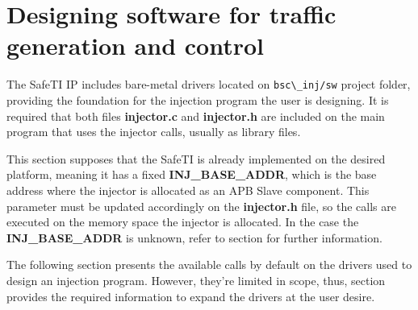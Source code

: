 \newpage
\section{Designing software for traffic generation and control}
\label{software}

The SafeTI IP includes bare-metal drivers located on \verb|bsc\_inj/sw| project folder, providing the foundation for the injection program the user is designing. 
It is required that both files \textbf{injector.c} and \textbf{injector.h} are included on the main program that uses the injector calls, usually as library files.

This section supposes that the SafeTI is already implemented on the desired platform, meaning it has a fixed \textbf{INJ\_BASE\_ADDR}, which is the base address 
where the injector is allocated as an APB Slave component. This parameter must be updated accordingly on the \textbf{injector.h} file, so the calls are executed 
on the memory space the injector is allocated. In the case the \textbf{INJ\_BASE\_ADDR} is unknown, refer to section \fullref{} for further information.

The following section  presents the available calls by default on the drivers used to design an injection program.
However, they're limited in scope, thus, section  provides the required information to expand the drivers at the user desire.





